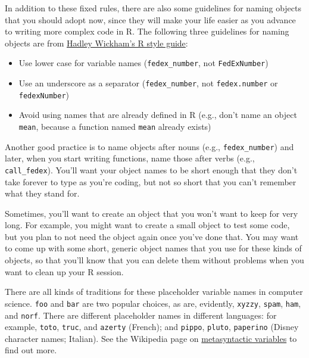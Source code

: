 \documentclass[]{book}
\makeatletter
\providecommand{\tightlist}{%
  \setlength{\itemsep}{0pt}\setlength{\parskip}{0pt}}
\newenvironment{kframe}{%
\medskip{}
\setlength{\fboxsep}{.8em}
 \def\at@end@of@kframe{}%
 \ifinner\ifhmode%
  \def\at@end@of@kframe{\end{minipage}}%
  \begin{minipage}{\columnwidth}%
 \fi\fi%
 \def\FrameCommand##1{\hskip\@totalleftmargin \hskip-\fboxsep
 \colorbox{shadecolor}{##1}\hskip-\fboxsep
     \hskip-\linewidth \hskip-\@totalleftmargin \hskip\columnwidth}%
 \MakeFramed {\advance\hsize-\width
   \@totalleftmargin\z@ \linewidth\hsize
   \@setminipage}}%
 {\par\unskip\endMakeFramed%
 \at@end@of@kframe}
\newenvironment{rmdblock}[1]
  {
  \begin{itemize}
  \renewcommand{\labelitemi}{
    \raisebox{-.7\height}[0pt][0pt]{
      {\setkeys{Gin}{width=3em,keepaspectratio}\texttt{[image: images/\#1]}}
    }
  }
  \setlength{\fboxsep}{1em}
  \begin{kframe}
  \item
  }
  {
  \end{kframe}
  \end{itemize}
  }
\newenvironment{rmdtip}
  {\begin{rmdblock}{tip}}
  {\end{rmdblock}}
\theoremstyle{definition}
\theoremstyle{definition}
\theoremstyle{definition}
\theoremstyle{remark}
\makeatother
\begin{document}
In addition to these fixed rules, there are also some guidelines for
naming objects that you should adopt now, since they will make your life
easier as you advance to writing more complex code in R. The following
three guidelines for naming objects are from
\href{http://adv-r.had.co.nz/Style.html}{Hadley Wickham's R style
guide}:

\begin{itemize}
\tightlist
\item
  Use lower case for variable names (\texttt{fedex\_number}, not
  \texttt{FedExNumber})
\item
  Use an underscore as a separator (\texttt{fedex\_number}, not
  \texttt{fedex.number} or \texttt{fedexNumber})
\item
  Avoid using names that are already defined in R (e.g., don't name an
  object \texttt{mean}, because a function named \texttt{mean} already
  exists)
\end{itemize}

Another good practice is to name objects after nouns (e.g.,
\texttt{fedex\_number}) and later, when you start writing functions,
name those after verbs (e.g., \texttt{call\_fedex}). You'll want your
object names to be short enough that they don't take forever to type as
you're coding, but not so short that you can't remember what they stand
for.

\begin{rmdtip}
Sometimes, you'll want to create an object that you won't want to keep
for very long. For example, you might want to create a small object to
test some code, but you plan to not need the object again once you've
done that. You may want to come up with some short, generic object names
that you use for these kinds of objects, so that you'll know that you
can delete them without problems when you want to clean up your R
session.

There are all kinds of traditions for these placeholder variable names
in computer science. \texttt{foo} and \texttt{bar} are two popular
choices, as are, evidently, \texttt{xyzzy}, \texttt{spam}, \texttt{ham},
and \texttt{norf}. There are different placeholder names in different
languages: for example, \texttt{toto}, \texttt{truc}, and
\texttt{azerty} (French); and \texttt{pippo}, \texttt{pluto},
\texttt{paperino} (Disney character names; Italian). See the Wikipedia
page on
\href{https://en.wikipedia.org/wiki/Metasyntactic_variable}{metasyntactic
variables} to find out more.
\end{rmdtip}
\end{document}
